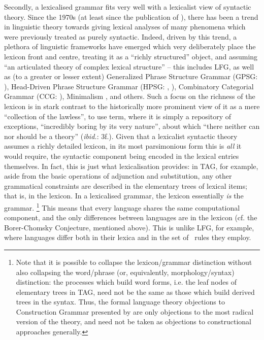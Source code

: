\documentclass[output=paper,hidelinks]{langscibook}
\begin{document}
Secondly, a lexicalised grammar fits very well with a lexicalist view of
syntactic theory. Since the 1970s (at least since the publication of
\citealt{chomsky1970remarks}), there has been a trend in linguistic theory
towards giving lexical analyses of many phenomena which were previously treated
as purely syntactic.
Indeed, driven by this trend, a plethora of linguistic frameworks have emerged
which very deliberately place the lexicon front and centre, treating it as a
``richly structured'' object, and assuming ``an articulated theory of complex
lexical structure'' \citep[3]{dalrymple01} -- this includes LFG, as well as (to
a greater or lesser extent) Generalized Phrase Structure Grammar (GPSG:
\citealp{gkps}), Head-Driven Phrase Structure Grammar (HPSG:
\citealp{pollard1994head-driven}, \citealt{mullerwechsler14}), Combinatory Categorial Grammar (CCG:
\citealp{steedman2000ccg}), Minimalism \citep{chomsky1995the-minimalist}, and others. %
%
Such a focus on the richness of the lexicon is in stark contrast to the
historically more prominent view of it as a mere ``collection of the lawless'',
to use  term, where it is simply a repository of
exceptions, ``incredibly boring by its very nature'', about which ``there
neither can nor should be a theory'' (\textit{ibid.}: 3f.). Given that a
lexicalist syntactic theory assumes a richly detailed lexicon, in its most
parsimonious form this is \emph{all} it would require, the syntactic component
being encoded in the lexical entries themselves. In fact, this is just what
lexicalisation provides: in TAG, for example, aside from the basic operations of
adjunction and substitution, any other grammatical constraints are described in
the elementary trees of lexical items; that is, in the lexicon. In a lexicalised
grammar, the lexicon essentially \emph{is} the grammar.%
%
\footnote{Note that it is possible to collapse the lexicon\slash grammar
  distinction without also collapsing the word\slash phrase (or, equivalently,
  morphology\slash syntax) distinction: the processes which build word forms,
  i.e. the leaf nodes of elementary trees in TAG, need not be the same as those
  which build derived trees in the syntax. Thus, the formal language theory
  objections to Construction Grammar presented by
  \citet[4f.]{asudeh2013constructions} are only objections to the most radical
  version of the theory, and need not be taken as objections to constructional
  approaches generally.}
%
This means that every language shares the same computational component, and the
only differences between languages are in the lexicon (cf. the Borer-Chomsky
Conjecture, mentioned above). This is unlike LFG, for example, where languages
differ both in their lexica and in the set of \cstruc\ rules they employ.
\end{document}
